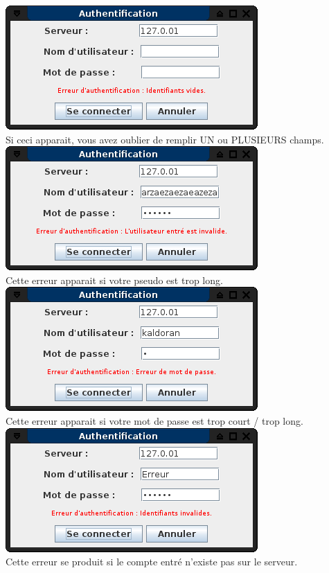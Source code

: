 \documentclass[12pt,a4paper]{article}
\begin{document}
\begin{center}

	\includegraphics[scale=0.5]{images/erreurvide.png} \\
	Si ceci apparait, vous avez oublier de remplir UN ou PLUSIEURS champs. \\

	\includegraphics[scale=0.5]{images/erreurpseudo.png} \\
	Cette erreur apparait si votre pseudo est trop long. \\

	\includegraphics[scale=0.5]{images/erreurpass.png} \\
	Cette erreur apparait si votre mot de passe est trop court / trop long. \\

	\includegraphics[scale=0.5]{images/erreurid.png} \\
	Cette erreur se produit si le compte entré n'existe pas sur le serveur. \\

\end{center}
\end{document}
